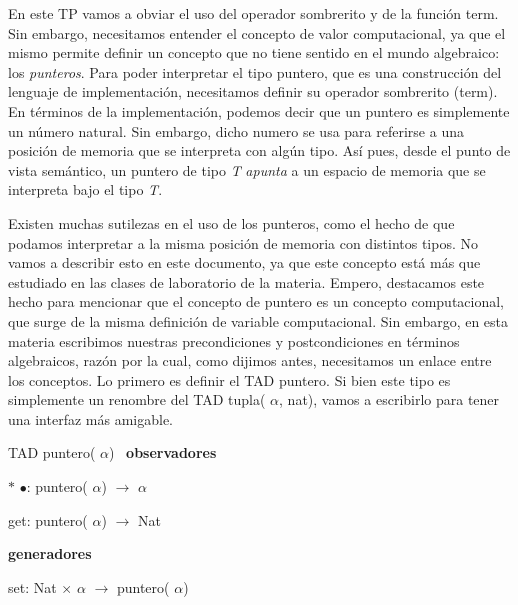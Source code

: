 En este TP vamos a obviar el uso del operador sombrerito y de la función term. Sin embargo, necesitamos entender el concepto de valor computacional, ya que el mismo permite definir un concepto que no tiene sentido en el mundo algebraico\+: los {\itshape punteros}. Para poder interpretar el tipo puntero, que es una construcción del lenguaje de implementación, necesitamos definir su operador sombrerito (term). En términos de la implementación, podemos decir que un puntero es simplemente un número natural. Sin embargo, dicho numero se usa para referirse a una posición de memoria que se interpreta con algún tipo. Así pues, desde el punto de vista semántico, un puntero de tipo {\itshape T} {\itshape apunta} a un espacio de memoria que se interpreta bajo el tipo {\itshape T}.

Existen muchas sutilezas en el uso de los punteros, como el hecho de que podamos interpretar a la misma posición de memoria con distintos tipos. No vamos a describir esto en este documento, ya que este concepto está más que estudiado en las clases de laboratorio de la materia. Empero, destacamos este hecho para mencionar que el concepto de puntero es un concepto computacional, que surge de la misma definición de variable computacional. Sin embargo, en esta materia escribimos nuestras precondiciones y postcondiciones en términos algebraicos, razón por la cual, como dijimos antes, necesitamos un enlace entre los conceptos. Lo primero es definir el T\+AD puntero. Si bien este tipo es simplemente un renombre del T\+AD tupla( $\alpha$, nat), vamos a escribirlo para tener una interfaz más amigable.

T\+AD puntero( $\alpha$)~\newline
{\bfseries observadores} ~\newline

\begin{DoxyItemize}
\item $\ast$ $\bullet$\+: puntero( $\alpha$) $\to$ $\alpha$~\newline

\item get\+: puntero( $\alpha$) $\to$ Nat
\end{DoxyItemize}

{\bfseries generadores} ~\newline

\begin{DoxyItemize}
\item set\+: Nat $\times$ $\alpha$ $\to$ puntero( $\alpha$)
\end{DoxyItemize}

